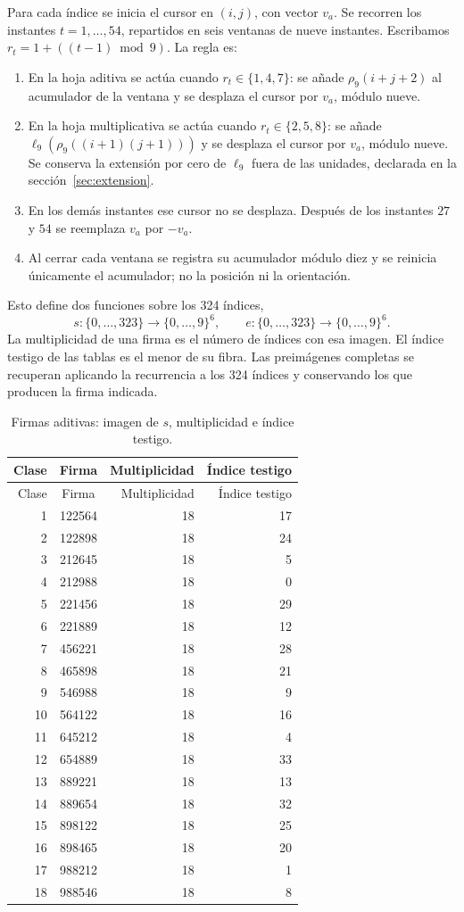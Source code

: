 Para cada índice se inicia el cursor en \((i,j)\), con vector \(v_a\).
Se recorren los instantes \(t=1,\ldots,54\), repartidos en seis ventanas
de nueve instantes. Escribamos \(r_t=1+((t-1)\bmod9)\). La regla es:
\begin{enumerate}
\item En la hoja aditiva se actúa cuando \(r_t\in\{1,4,7\}\):
se añade \(\rho_9(i+j+2)\) al acumulador de la ventana y se
desplaza el cursor por \(v_a\), módulo nueve.
\item En la hoja multiplicativa se actúa cuando \(r_t\in\{2,5,8\}\):
se añade \(\ell_9(\rho_9((i+1)(j+1)))\) y se desplaza el cursor
por \(v_a\), módulo nueve. Se conserva la extensión por cero de
\(\ell_9\) fuera de las unidades, declarada en la sección~\ref{sec:extension}.
\item En los demás instantes ese cursor no se desplaza. Después
de los instantes \(27\) y \(54\) se reemplaza \(v_a\) por \(-v_a\).
\item Al cerrar cada ventana se registra su acumulador módulo diez
y se reinicia únicamente el acumulador; no la posición ni la orientación.
\end{enumerate}
Esto define dos funciones sobre los 324 índices,
\[
 s:\{0,\ldots,323\}\longrightarrow\{0,\ldots,9\}^6,\qquad
 e:\{0,\ldots,323\}\longrightarrow\{0,\ldots,9\}^6.
\]
La multiplicidad de una firma es el número de índices con esa imagen.
El índice testigo de las tablas es el menor de su fibra.
Las preimágenes completas se recuperan aplicando la recurrencia a los
324 índices y conservando los que producen la firma indicada.

\begin{longtable}{rcrr}
\caption{Firmas aditivas: imagen de \(s\), multiplicidad e índice testigo.}
\label{iv:tabla-firmas-aditivas}\\
\toprule
Clase & Firma & Multiplicidad & Índice testigo\\
\midrule
\endfirsthead
\toprule
Clase & Firma & Multiplicidad & Índice testigo\\
\midrule
\endhead
1&122564&18&17\\
2&122898&18&24\\
3&212645&18&5\\
4&212988&18&0\\
5&221456&18&29\\
6&221889&18&12\\
7&456221&18&28\\
8&465898&18&21\\
9&546988&18&9\\
10&564122&18&16\\
11&645212&18&4\\
12&654889&18&33\\
13&889221&18&13\\
14&889654&18&32\\
15&898122&18&25\\
16&898465&18&20\\
17&988212&18&1\\
18&988546&18&8\\
\bottomrule
\end{longtable}

